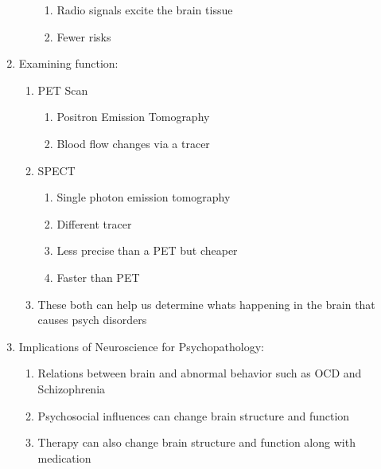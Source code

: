 \documentclass[12pt]{article}
\begin{document}
\begin{enumerate}
\begin{enumerate}
\begin{enumerate}
    \item Radio signals excite the brain tissue
    \item Fewer risks
    \end{enumerate}
  \end{enumerate}
\item Examining function:
  \begin{enumerate}  
  \item PET Scan
    \begin{enumerate}
    \item Positron Emission Tomography
    \item Blood flow changes via a tracer
    \end{enumerate}
  \item SPECT
    \begin{enumerate}
    \item Single photon emission tomography
    \item Different tracer
    \item Less precise than a PET but cheaper
    \item Faster than PET
    \end{enumerate}
  \item These both can help us determine whats happening in the brain
    that causes psych disorders
  \end{enumerate}
\item Implications of Neuroscience for Psychopathology:
  \begin{enumerate}
  \item Relations between brain and abnormal behavior such as OCD and Schizophrenia
  \item Psychosocial influences can change brain structure and function
  \item Therapy can also change brain structure and function along
    with medication
  \end{enumerate}
\end{enumerate}
\end{document}
